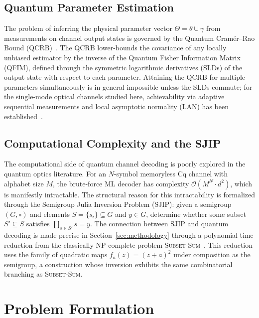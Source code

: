 \documentclass[journal,twocolumn]{IEEEtran}
\theoremstyle{definition}
\theoremstyle{plain}
\begin{document}
\subsection{Quantum Parameter Estimation}

The problem of inferring the physical parameter vector
$\Theta = \theta \cup \gamma$ from measurements on channel output
states is governed by the Quantum Cram\'{e}r--Rao Bound
(QCRB)~\cite{helstrom1976,holevo2011,paris2009}.  The QCRB
lower-bounds the covariance of any locally unbiased estimator by the
inverse of the Quantum Fisher Information Matrix (QFIM), defined
through the symmetric logarithmic derivatives (SLDs) of the output
state with respect to each parameter.  Attaining the QCRB for
multiple parameters simultaneously is in general impossible unless
the SLDs commute; for the single-mode optical channels studied here,
achievability via adaptive sequential measurements and local
asymptotic normality (LAN) has been established~\cite{giovannetti2011}.

\subsection{Computational Complexity and the SJIP}

The computational side of quantum channel decoding is poorly
explored in the quantum optics literature.  For an $N$-symbol
memoryless Cq channel with alphabet size $M$, the brute-force ML
decoder has complexity $\mathcal{O}(M^N \cdot d^2)$, which is
manifestly intractable.  The structural reason for this intractability
is formalized through the Semigroup Julia Inversion Problem (SJIP):
given a semigroup $(G,\circ)$ and elements $S = \{s_i\} \subseteq G$
and $y \in G$, determine whether some subset $S' \subseteq S$
satisfies $\prod_{s \in S'} s = y$.  The connection between SJIP
and quantum decoding is made precise in Section~\ref{sec:methodology}
through a polynomial-time reduction from the classically NP-complete
problem \textsc{Subset-Sum}~\cite{garey1979}.  This reduction uses
the family of quadratic maps $f_a(z) = (z+a)^2$ under composition
as the semigroup, a construction whose inversion exhibits the same
combinatorial branching as \textsc{Subset-Sum}.

\section{Problem Formulation}
\label{sec:problem}
\end{document}
